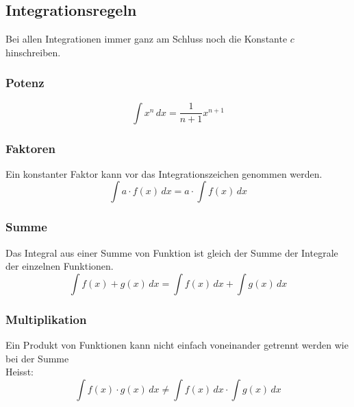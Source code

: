 \documentclass[12pt]{scrartcl}
\begin{document}
\newpage
\subsection{Integrationsregeln}\label{Integrationsregeln unb. Integrale}
Bei allen Integrationen immer ganz am Schluss noch die Konstante $c$ hinschreiben.

\subsubsection{Potenz}
\[\int x^n \, dx = \frac{1}{n + 1}x^{n + 1}\]

\subsubsection{Faktoren}
Ein konstanter Faktor kann vor das Integrationszeichen genommen werden.
\[\int a \cdot f(x) \, dx = a \cdot \int f(x) \, dx\]


\subsubsection{Summe}
Das Integral aus einer Summe von Funktion ist gleich der Summe der Integrale
der einzelnen Funktionen.
\[\int f(x) + g(x) \, dx = \int f(x)\, dx + \int g(x) \, dx\]

\subsubsection{Multiplikation}
Ein Produkt von Funktionen kann nicht einfach voneinander getrennt werden wie bei der Summe\\
Heisst:
\[\int f(x) \cdot g(x) \, dx \neq \int f(x) \, dx \cdot \int g(x) \, dx\]


\newpage
\end{document}
